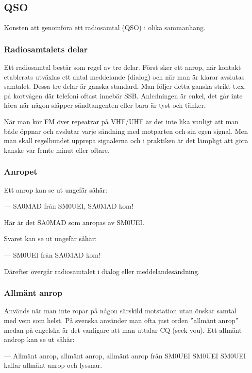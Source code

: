 \subsection{QSO}

Konsten att genomföra ett radiosamtal (QSO) i olika sammanhang.

\subsubsection{Radiosamtalets delar}

Ett radiosamtal består som regel av tre delar. Först sker ett anrop, när kontakt etablerats utväxlas ett antal meddelande (dialog) och när man är klarar avslutas samtalet. Dessa tre delar är ganska standard. Man följer detta ganska strikt t.ex. på kortvågen där telefoni oftast innebär SSB. Anledningen är enkel, det går inte höra när någon släpper sändtangenten eller bara är tyst och tänker.

När man kör FM över repeatrar på VHF/UHF är det inte lika vanligt att man både öppnar och avslutar varje sändning med motparten och sin egen signal. Men man skall regelbundet upprepa signalerna och i praktiken är det lämpligt att göra kanske var femte minut eller oftare.

\subsubsection{Anropet}

Ett anrop kan se ut ungefär såhär:

--- SA0MAD från SM0UEI, SA0MAD kom!

Här är det SA0MAD som anropas av SM0UEI. 

Svaret kan se ut ungefär såhär:

--- SM0UEI från SA0MAD kom!

Därefter övergår radiosamtalet i dialog eller meddelandesändning.

\subsubsection{Allmänt anrop} 

Används när man inte ropar på någon särskild motstation utan önskar samtal med vem som helst. På svenska använder man ofta just orden ''allmänt anrop'' medan på engelska är det vanligare att man uttalar CQ (seek you). Ett allmänt androp kan se ut såhär:

--- Allmänt anrop, allmänt anrop, allmänt anrop från SM0UEI SM0UEI SM0UEI kallar allmänt anrop och lyssnar.


